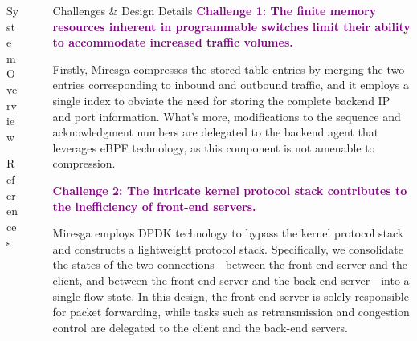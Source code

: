 \documentclass[final, 24pt]{beamer}
\newlength{\sepwidth}
\newlength{\colwidth}
\newcommand{\separatorcolumn}{\begin{column}{\sepwidth}\end{column}}
\begin{document}
\begin{frame}[t]
\begin{columns}[t]
\begin{column}{\colwidth}
\begin{alertblock}{System Overview}
  \end{alertblock}
  \begin{block}{References}

    \nocite{*}
    \footnotesize{}

  \end{block}
\end{column}

\separatorcolumn

\begin{column}{\colwidth}

  \begin{alertblock}{Challenges \& Design Details}
  \textcolor{purple}{\textbf{Challenge 1: The finite memory resources inherent in programmable switches limit their ability to accommodate increased traffic volumes.}}

  Firstly, Miresga compresses the stored table entries by merging the two entries corresponding to inbound and outbound traffic, and it employs a single index to obviate the need for storing the complete backend IP and port information. What's more, modifications to the sequence and acknowledgment numbers are delegated to the backend agent that leverages eBPF technology, as this component is not amenable to compression. 

  \textcolor{purple}{\textbf{Challenge 2: The intricate kernel protocol stack contributes to the inefficiency of front-end servers.}}
  
  Miresga employs DPDK technology to bypass the kernel protocol stack and constructs a lightweight protocol stack. Specifically, we consolidate the states of the two connections—between the front-end server and the client, and between the front-end server and the back-end server—into a single flow state. In this design, the front-end server is solely responsible for packet forwarding, while tasks such as retransmission and congestion control are delegated to the client and the back-end servers.


\end{alertblock}
\end{column}
\end{columns}
\end{frame}
\end{document}
